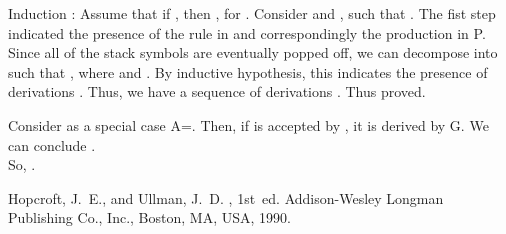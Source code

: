 \documentclass[11pt,a4paper,portrait]{extarticle}
\begin{document}
Induction : Assume that if , then , for . Consider  and , such that .
The fist step indicated the presence of the rule  in  and correspondingly the production  in P.
Since all of the stack symbols  are eventually popped off, we can decompose  into  such that , where  and .
By inductive hypothesis, this indicates the presence of derivations . 
Thus, we have a sequence of derivations . Thus proved.

Consider as a special case A=. Then, if  is accepted by , it is derived by G. We can conclude .\\

So, .

\begin{thebibliography}{1}

{\sc Hopcroft, J.~E., and Ullman, J.~D.}
,
  1st~ed.
\newblock Addison-Wesley Longman Publishing Co., Inc., Boston, MA, USA, 1990.

\end{thebibliography} 
\end{document}
